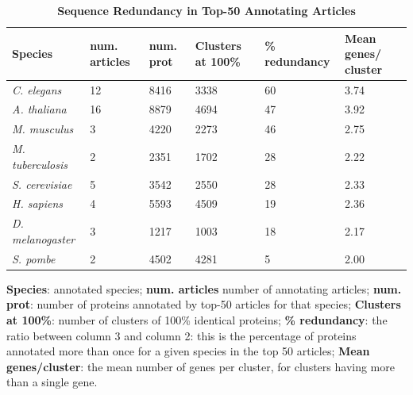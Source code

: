 \documentclass[12pt]{article}
\begin{document}
\begin{table}[!ht]
\caption{
\bf{Sequence Redundancy in Top-50 Annotating Articles}}
\begin{tabular}{|p{3cm}|p{1.5cm}|p{2cm}|p{2cm}|p{2cm}|p{2cm}|} %
\hline
\textbf{Species} & \textbf{num. articles} &\textbf{num. prot} & \textbf{Clusters at 100\%} & 
\textbf{\% redundancy} & \textbf{Mean genes/ cluster} %
\\ \hline
\textit{C. elegans}  & 12 & 8416 & 3338 & 60 & 3.74 %
\\ \hline
\textit{A. thaliana}  & 16 &  8879 & 4694 & 47 & 3.92 %
\\ \hline
\textit{M. musculus}  & 3 &  4220 & 2273 & 46 & 2.75  %
\\ \hline
\textit{M. tuberculosis}  & 2 & 2351& 1702& 28 & 2.22 %
\\ \hline
\textit{S. cerevisiae}  & 5 & 3542 & 2550 & 28 & 2.33 %
\\ \hline
\textit{H. sapiens}  & 4 & 5593 & 4509 & 19 & 2.36 %
\\ \hline
\textit{D. melanogaster} & 3  & 1217 & 1003 & 18 & 2.17 %
\\ \hline
\textit{S. pombe}  & 2 & 4502 & 4281 & 5 & 2.00 %
\\ \hline
\end{tabular}
\begin{flushleft} 
\textbf{Species}: annotated species; 
\textbf{num. articles} number of annotating articles;
\textbf{num. prot}: number of proteins annotated by top-50 articles for that species; 
\textbf{Clusters at 100\%}: number of clusters of 100\% identical proteins; 
\textbf{\% redundancy}: the ratio between column 3 and column 2: this is the percentage of proteins
annotated more than once for a given species in the top 50 articles; 
\textbf{Mean genes/cluster}: the mean number of genes per cluster, for clusters
having more than a single gene.
\end{flushleft}
\label{tab:dreamcatcher1}
\end{table}
\newpage
\end{document}
